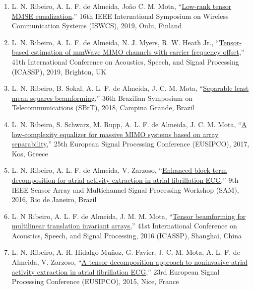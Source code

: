 \begin{enumerate}
	\item L. N. Ribeiro, A. L. F. de Almeida, Jo\~ao C. M. Mota, ``\href{https://arxiv.org/abs/1912.08317}{Low-rank tensor MMSE equalization},'' 16th IEEE International Symposium on Wireless Communication Systems (ISWCS), 2019, Oulu, Finland
	
	\item L. N. Ribeiro, A. L. F. de Almeida, N. J. Myers, R. W. Heath Jr., ``\href{https://doi.org/10.1109/ICASSP.2019.8683496}{Tensor-based estimation of mmWave MIMO channels with carrier frequency offset},'' 41th International Conference on Acoustics, Speech, and Signal Processing (ICASSP), 2019, Brighton, UK
	
	\item L. N. Ribeiro, B. Sokal, A. L. F. de Almeida, J. C. M. Mota, ``\href{https://github.com/lnribeiro/lnribeiro.github.io/blob/master/assets/pdf/sbrt18.pdf}{Separable least mean squares beamforming},'' 36th Brazilian Symposium on Telecommunications (SBrT), 2018, Campina Grande, Brazil
	
	\item L. N. Ribeiro, S. Schwarz, M. Rupp, A. L. F. de Almeida, J. C. M. Mota, ``\href{https://doi.org/10.23919/EUSIPCO.2017.8081651}{A low-complexity equalizer for massive MIMO systems based on array separability},'' 25th European Signal Processing Conference (EUSIPCO), 2017, Kos, Greece
	
	\item L. N. Ribeiro, A. L. F. de Almeida, V. Zarzoso, ``\href{https://doi.org/10.1109/SAM.2016.7569709}{Enhanced block term decomposition for atrial activity extraction in atrial fibrillation ECG},'' 9th IEEE Sensor Array and Multichannel Signal Processing Workshop (SAM), 2016, Rio de Janeiro, Brazil
	
	\item L. N Ribeiro,  A. L. F. de Almeida, J. M. M. Mota, ``\href{https://doi.org/10.1109/ICASSP.2016.7472221}{Tensor beamforming for multilinear translation invariant arrays},'' 41st International Conference on Acoustics, Speech, and Signal Processing, 2016 (ICASSP), Shanghai, China
	
	\item  L. N. Ribeiro, A. R. Hidalgo-Mu\~{n}oz, G. Favier, J. C. M. Mota, A. L. F. de Almeida,  V. Zarzoso, ``\href{https://doi.org/10.1109/EUSIPCO.2015.7362850}{A tensor decomposition approach to noninvasive atrial activity extraction in atrial fibrillation ECG},'' 23rd European Signal Processing Conference (EUSIPCO), 2015, Nice, France
	

\end{enumerate}
